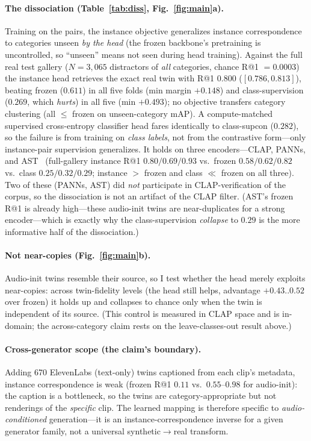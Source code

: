 \documentclass{article}
\begin{document}
\paragraph{The dissociation (Table~\ref{tab:diss}, Fig.~\ref{fig:main}a).}
\label{sec:diss}
Training on the pairs, the instance objective generalizes instance correspondence to categories
unseen \emph{by the head} (the frozen backbone's pretraining is uncontrolled, so ``unseen'' means
not seen during head training). Against the full real test gallery ($N\!=\!3{,}065$ distractors of
\emph{all} categories, chance R@1 $=0.0003$) the instance head retrieves the exact real twin with
R@1 $0.800$ ($[0.786,0.813]$), beating frozen ($0.611$) in all five folds (min margin $+0.148$) and
class-supervision ($0.269$, which \emph{hurts}) in all five (min $+0.493$); no objective transfers
category clustering (all $\le$ frozen on unseen-category mAP). A compute-matched supervised
cross-entropy classifier head fares identically to class-supcon ($0.282$), so the failure is from
training on \emph{class labels}, not from the contrastive form---only instance-pair supervision
generalizes. It holds on three encoders---CLAP,
PANNs, and AST~\citep{gong2021ast} (full-gallery instance R@1 $0.80/0.69/0.93$ vs.\ frozen
$0.58/0.62/0.82$ vs.\ class $0.25/0.32/0.29$; instance $>$ frozen and class $\ll$ frozen on all
three). Two of these (PANNs, AST) did \emph{not} participate in CLAP-verification of the corpus, so
the dissociation is not an artifact of the CLAP filter. (AST's frozen R@1 is already high---these
audio-init twins are near-duplicates for a strong encoder---which is exactly why the
class-supervision \emph{collapse} to $0.29$ is the more informative half of the dissociation.)

\paragraph{Not near-copies (Fig.~\ref{fig:main}b).} Audio-init twins resemble their source, so I
test whether the head merely exploits near-copies: across twin-fidelity levels (the head still
helps, advantage $+0.43..0.52$ over frozen) it holds up and collapses to chance only when the twin
is independent of its source. (This control is measured in CLAP space and is in-domain; the
across-category claim rests on the leave-classes-out result above.)

\paragraph{Cross-generator scope (the claim's boundary).} Adding 670 ElevenLabs (text-only) twins
captioned from each clip's metadata, instance correspondence is weak (frozen R@1 $0.11$ vs.\
$0.55$--$0.98$ for audio-init): the caption is a bottleneck, so the twins are category-appropriate
but not renderings of the \emph{specific} clip. The learned mapping is therefore specific to
\emph{audio-conditioned} generation---it is an instance-correspondence inverse for a given
generator family, not a universal synthetic$\to$real transform.
\end{document}
